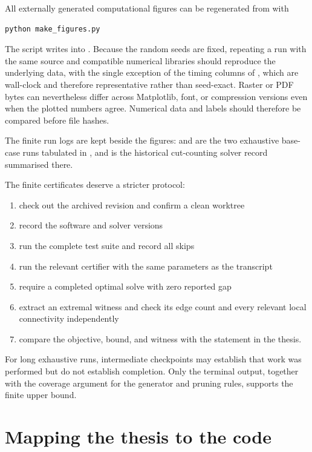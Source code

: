 All externally generated computational figures can be regenerated from  with

\begin{verbatim}
python make_figures.py
\end{verbatim}
The script writes into . Because the random seeds are fixed, repeating a run with the same source and compatible numerical libraries should reproduce the underlying data, with the single exception of the timing columns of , which are wall-clock and therefore representative rather than seed-exact. Raster or PDF bytes can nevertheless differ across Matplotlib, font, or compression versions even when the plotted numbers agree. Numerical data and labels should therefore be compared before file hashes.

The finite run logs are kept beside the figures:  and  are the two exhaustive base-case runs tabulated in , and  is the historical cut-counting solver record summarised there.

The finite certificates deserve a stricter protocol:

\begin{enumerate}
  \item check out the archived revision and confirm a clean worktree
  \item record the software and solver versions
  \item run the complete test suite and record all skips
  \item run the relevant certifier with the same parameters as the transcript
  \item require a completed optimal solve with zero reported gap
  \item extract an extremal witness and check its edge count and every relevant local connectivity independently
  \item compare the objective, bound, and witness with the statement in the thesis.
\end{enumerate}

For long exhaustive runs, intermediate checkpoints may establish that work was performed but do not establish completion. Only the terminal output, together with the coverage argument for the generator and pruning rules, supports the finite upper bound.

\section{Mapping the thesis to the code}\label{app:software-map}

